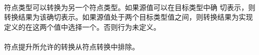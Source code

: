 \paragraph{} %
符点类型\prvalue{}可以转换为另一个符点类型\prvalue{}。如果源值可以在目标类型中确
切表示，则转换结果为该确切表示。如果源值处于两个目标类型值之间，则转换结果为实现
定义的在这两个值中选择一个。否则行为未定义。

\paragraph{} %
符点提升所允许的转换从符点转换中排除。
